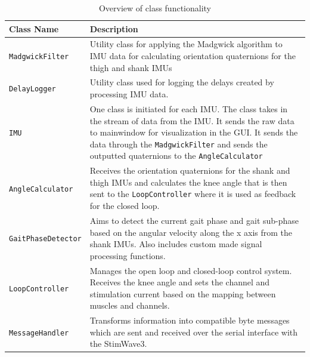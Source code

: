 \begin{table}[H]
\centering
\renewcommand{\arraystretch}{1.3} %
\begin{tcolorbox}[
    colback=white,      %
    colframe=black,     %
    arc=3mm,            %
    boxrule=0.5mm,      %
    width=\textwidth,   %
    halign=center       %
]
\begin{tabular}{p{} | p{}} %
\textbf{Class Name} & \textbf{Description} \\ \hline
\texttt{MadgwickFilter} & Utility class for applying the Madgwick algorithm to IMU data for calculating orientation quaternions for the thigh and shank IMUs \\

\texttt{DelayLogger} & Utility class used for logging the delays created by processing IMU data. \\

\texttt{IMU} & One class is initiated for each IMU. The class takes in the stream of data from the IMU. It sends the raw data to mainwindow for visualization in the GUI. It sends the data through the \texttt{MadgwickFilter} and sends the outputted quaternions to the \texttt{AngleCalculator} \\

\texttt{AngleCalculator} & Receives the orientation quaternions for the shank and thigh IMUs and calculates the knee angle that is then sent to the \texttt{LoopController} where it is used as feedback for the closed loop.\\

\texttt{GaitPhaseDetector} & Aims to detect the current gait phase and gait sub-phase based on the angular velocity along the x axis from the shank IMUs. Also includes custom made signal processing functions.  \\

\texttt{LoopController} & Manages the open loop and closed-loop control system. Receives the knee angle and sets the channel and stimulation current based on the mapping between muscles and channels. \\

\texttt{MessageHandler} & Transforms information into compatible byte messages which are sent and received over the serial interface with the StimWave3. \\
\end{tabular}
\end{tcolorbox}
\caption{Overview of class functionality}
\label{tab:class-overview}
\end{table}

